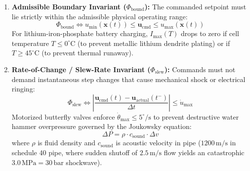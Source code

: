 \begin{enumerate}
    \item \textbf{Admissible Boundary Invariant ($\Phi_{\mathrm{bound}}$):} The commanded setpoint must lie strictly within the admissible physical operating range:
    \begin{equation}
    \Phi_{\mathrm{bound}} \iff u_{\min}(\mathbf{x}(t)) \le \mathbf{u}_{\mathrm{cmd}} \le u_{\max}(\mathbf{x}(t))
    \label{eq:l2_phi_bound}
    \end{equation}
    For lithium-iron-phosphate battery charging, $I_{\max}(T)$ drops to zero if cell temperature $T \le 0^\circ\mathrm{C}$ (to prevent metallic lithium dendrite plating) or if $T \ge 45^\circ\mathrm{C}$ (to prevent thermal runaway).
    
    \item \textbf{Rate-of-Change / Slew-Rate Invariant ($\Phi_{\mathrm{slew}}$):} Commands must not demand instantaneous step changes that cause mechanical shock or electrical ringing:
    \begin{equation}
    \Phi_{\mathrm{slew}} \iff \left| \frac{\mathbf{u}_{\mathrm{cmd}}(t) - \mathbf{u}_{\mathrm{actual}}(t^-)}{\Delta t} \right| \le \dot{u}_{\max}
    \label{eq:l2_phi_slew}
    \end{equation}
    Motorized butterfly valves enforce $\dot{\theta}_{\max} \le 5^\circ/\mathrm{s}$ to prevent destructive water hammer overpressure governed by the Joukowsky equation:
    \begin{equation}
    \Delta P = \rho \cdot c_{\mathrm{sound}} \cdot \Delta v
    \label{eq:l2_joukowsky}
    \end{equation}
    where $\rho$ is fluid density and $c_{\mathrm{sound}}$ is acoustic velocity in pipe ($1200\,\mathrm{m/s}$ in schedule 40 pipe, where sudden shutoff of $2.5\,\mathrm{m/s}$ flow yields an catastrophic $3.0\,\mathrm{MPa} = 30\,\mathrm{bar}$ shockwave).
    

\end{enumerate}
